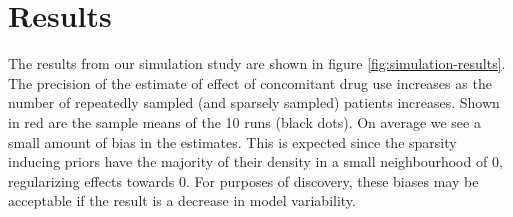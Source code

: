 \section{Results}

The results from our simulation study are shown in figure \ref{fig:simulation-results}. The precision of the estimate of effect of concomitant drug use increases as the number of repeatedly sampled (and sparsely sampled) patients increases.  Shown in red are the sample means of the 10 runs (black dots).  On average we see a small amount of bias in the estimates.  This is expected since the sparsity inducing priors have the majority of their density in a small neighbourhood of 0, regularizing effects towards 0.  For purposes of discovery, these biases may be acceptable if the result is a decrease in model variability.



